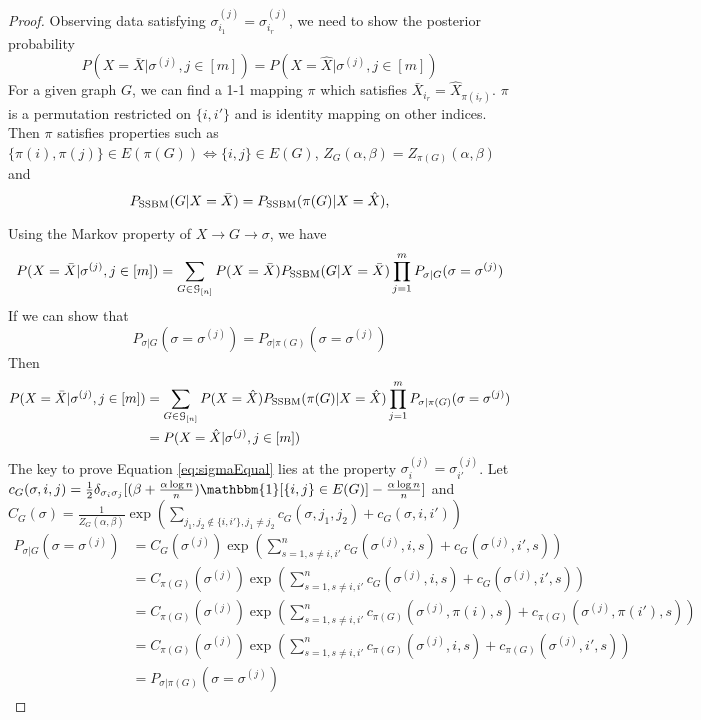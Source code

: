\documentclass{article}
\begin{document}
\begin{proof}
Observing data satisfying $\sigma_{i_1}^{(j)}=\sigma_{i_r}^{(j)}$, we need to show the posterior probability
\begin{equation}\label{eq:11}
P(X=\bar{X} | \sigma^{(j)}, j\in[m]) =
P(X=\hat{X} | \sigma^{(j)}, j\in[m])
\end{equation}
For a given graph $G$, we can find a 1-1 mapping $\pi$ which satisfies $ \bar{X}_{i_r} = \hat{X}_{\pi(i_r)}$.
$\pi$ is a permutation restricted on $\{i,i'\}$ and is identity mapping on other indices.
Then $\pi$ satisfies properties such as
$\{\pi(i), \pi(j)\} \in E(\pi(G)) \iff \{i,j\} \in E(G)$, $Z_G(\alpha, \beta) = Z_{\pi(G)}(\alpha, \beta)$ and
$$
P_{\operatorname{SSBM}}(G  | X = \bar{X})=P_{\operatorname{SSBM}}(\pi(G) | X = \hat{X}),
$$

Using the Markov property of $X \to G \to \sigma$, we have
\begin{align*}
P(X=\bar{X} | \sigma^{(j)}, j\in[m])& = \sum_{G \in \mathcal{G}_{[n]}} P(X=\bar{X}) P_{\operatorname{SSBM}}(G  | X = \bar{X})\prod_{j=1}^m P_{\sigma | G}(\sigma =\sigma^{(j)})\\
\end{align*}
If we can show that 
\begin{equation}\label{eq:sigmaEqual}
P_{\sigma | G}(\sigma =\sigma^{(j)}) = P_{\sigma | \pi(G)}(\sigma =\sigma^{(j)})
\end{equation}
Then 
\begin{align*}
P(X=\bar{X} | \sigma^{(j)}, j\in[m]) &
= \sum_{G \in \mathcal{G}_{[n]}} P(X=\hat{X})
P_{\operatorname{SSBM}}(\pi(G)  | X = \hat{X})\prod_{j=1}^m P_{\sigma | \pi(G)}(\sigma =\sigma^{(j)})\\
& = P(X=\hat{X} | \sigma^{(j)}, j\in[m])
\end{align*}
The key to prove Equation \eqref{eq:sigmaEqual} lies at the property
$\sigma^{(j)}_{i} = \sigma^{(j)}_{i'}$.
Let $c_G(\sigma, i,j) = \frac{1}{2}\delta_{\sigma_i\sigma_j}[(\beta + \frac{\alpha \log n}{n})\mathbbm{1}[\{i,j\}\in E(G)]  - \frac{\alpha \log n}{n}]$
and $C_G(\sigma) = \frac{1}{Z_G(\alpha, \beta)}\exp(\sum_{j_1, j_2 \not\in \{i,i'\},j_1\neq j_2} c_G(\sigma, j_1, j_2) + c_G(\sigma, i, i'))$
\begin{align*}
P_{\sigma | G}(\sigma =\sigma^{(j)}) & = C_G(\sigma^{(j)})\exp(\sum_{s=1,s\neq i,i'}^n c_G(\sigma^{(j)}, i, s) + c_G(\sigma^{(j)}, i', s)) \\
& = C_{\pi(G)}(\sigma^{(j)})\exp(\sum_{s=1,s\neq i,i'}^n c_G(\sigma^{(j)}, i, s) + c_G(\sigma^{(j)}, i', s) ) \\
& = C_{\pi(G)}(\sigma^{(j)})\exp(\sum_{s=1,s\neq i,i'}^n c_{\pi(G)}(\sigma^{(j)}, \pi(i), s) + c_{\pi(G)}(\sigma^{(j)}, \pi(i'), s)) \\
& = C_{\pi(G)}(\sigma^{(j)})\exp(\sum_{s=1,s\neq i,i'}^n c_{\pi(G)}(\sigma^{(j)}, i, s) + c_{\pi(G)}(\sigma^{(j)}, i', s)) \\
& = P_{\sigma | \pi(G)}(\sigma =\sigma^{(j)})
\end{align*}
\end{proof}
\end{document}
